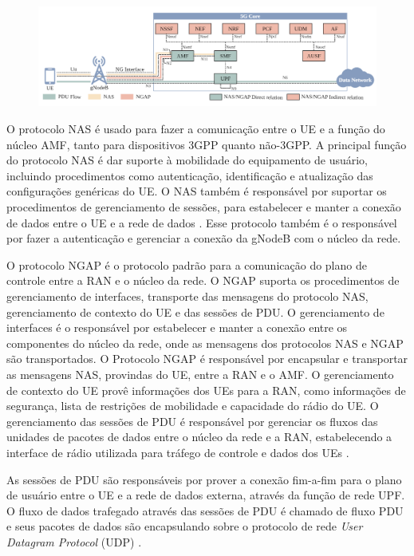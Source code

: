 \begin{figure}[!ht]
    \centering
    \includegraphics[width=1\textwidth]{TG1/Images/5GSystemProtocols.png}
    \label{fig:5Gprotocols}
\end{figure}

O protocolo NAS é usado para fazer a comunicação entre o UE e a função do núcleo AMF, tanto para dispositivos 3GPP quanto não-3GPP. A principal função do protocolo NAS é dar suporte à mobilidade do equipamento de usuário, incluindo procedimentos como autenticação, identificação e atualização das configurações genéricas do UE. O NAS também é responsável por suportar os procedimentos de gerenciamento de sessões, para estabelecer e manter a conexão de dados entre o UE e a rede de dados \cite{3gpp.24.501}. Esse protocolo também é o responsável por fazer a autenticação e gerenciar a conexão da gNodeB com o núcleo da rede.

O protocolo NGAP é o protocolo padrão para a comunicação do plano de controle entre a RAN e o núcleo da rede. O NGAP suporta os procedimentos de gerenciamento de interfaces, transporte das mensagens do protocolo NAS, gerenciamento de contexto do UE e das sessões de PDU. O gerenciamento de interfaces é o responsável por estabelecer e manter a conexão entre os componentes do núcleo da rede, onde as mensagens dos protocolos NAS e NGAP são transportados. O Protocolo NGAP é responsável por encapsular e transportar as mensagens NAS, provindas do UE, entre a RAN e o AMF. O gerenciamento de contexto do UE provê informações dos UEs para a RAN, como informações de segurança, lista de restrições de mobilidade e capacidade do rádio do UE. O gerenciamento das sessões de PDU é responsável por gerenciar os fluxos das unidades de pacotes de dados entre o núcleo da rede e a RAN, estabelecendo a interface de rádio utilizada para tráfego de controle e dados dos UEs \cite{3gpp.38.413}.

As sessões de PDU são responsáveis por prover a conexão fim-a-fim para o plano de usuário entre o UE e a rede de dados externa, através da função de rede UPF.
O fluxo de dados trafegado através das sessões de PDU é chamado de fluxo PDU e seus pacotes de dados são encapsulando sobre o protocolo de rede \textit{User Datagram Protocol} (UDP) \cite{3gpp.38.415}.

